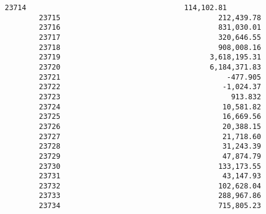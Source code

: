 \documentclass[11pt]{article}
\begin{document}
\begin{Verbatim}[commandchars=\\\{\}]
        23714                                     114,102.81   
        23715                                     212,439.78   
        23716                                     831,030.01   
        23717                                     320,646.55   
        23718                                     908,008.16   
        23719                                   3,618,195.31   
        23720                                   6,184,371.83   
        23721                                       -477.905   
        23722                                      -1,024.37   
        23723                                        913.832   
        23724                                      10,581.82   
        23725                                      16,669.56   
        23726                                      20,388.15   
        23727                                      21,718.60   
        23728                                      31,243.39   
        23729                                      47,874.79   
        23730                                     133,173.55   
        23731                                      43,147.93   
        23732                                     102,628.04   
        23733                                     288,967.86   
        23734                                     715,805.23   
        

\end{Verbatim}
\end{document}
